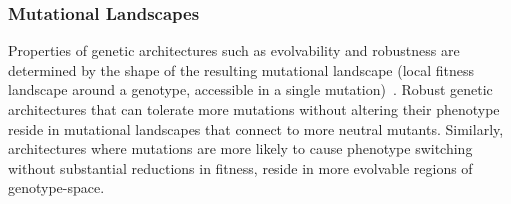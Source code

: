 \documentclass[10pt,letterpaper,final]{article}
\begin{document}
\subsubsection*{Mutational Landscapes}
Properties of genetic architectures such as evolvability and robustness are determined by the shape of the resulting mutational landscape (local fitness landscape around a genotype, accessible in a single mutation)~\cite{andreas_wagner_robustness_2008}. Robust genetic architectures that can tolerate more mutations without altering their phenotype reside in mutational landscapes that connect to more neutral mutants. Similarly, architectures where mutations are more likely to cause phenotype switching without substantial reductions in fitness, reside in more evolvable regions of genotype-space.
\end{document}
